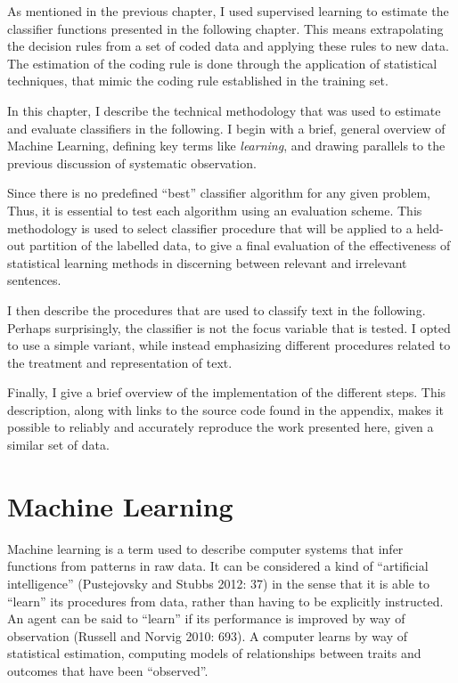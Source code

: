 \documentclass[12pt,twoside]{reedthesis}
\begin{document}
As mentioned in the previous chapter, I used supervised learning to
estimate the classifier functions presented in the following chapter.
This means extrapolating the decision rules from a set of coded data and
applying these rules to new data. The estimation of the coding rule is
done through the application of statistical techniques, that mimic the
coding rule established in the training set.

In this chapter, I describe the technical methodology that was used to
estimate and evaluate classifiers in the following. I begin with a
brief, general overview of Machine Learning, defining key terms like
\emph{learning}, and drawing parallels to the previous discussion of
systematic observation.

Since there is no predefined ``best'' classifier algorithm for any given
problem, Thus, it is essential to test each algorithm using an
evaluation scheme. This methodology is used to select classifier
procedure that will be applied to a held-out partition of the labelled
data, to give a final evaluation of the effectiveness of statistical
learning methods in discerning between relevant and irrelevant
sentences.

I then describe the procedures that are used to classify text in the
following. Perhaps surprisingly, the classifier is not the focus
variable that is tested. I opted to use a simple variant, while instead
emphasizing different procedures related to the treatment and
representation of text.

Finally, I give a brief overview of the implementation of the different
steps. This description, along with links to the source code found in
the appendix, makes it possible to reliably and accurately reproduce the
work presented here, given a similar set of data.

\section{Machine Learning}\label{machine-learning}

Machine learning is a term used to describe computer systems that infer
functions from patterns in raw data. It can be considered a kind of
``artificial intelligence'' (Pustejovsky and Stubbs 2012: 37) in the
sense that it is able to ``learn'' its procedures from data, rather than
having to be explicitly instructed. An agent can be said to ``learn'' if
its performance is improved by way of observation (Russell and Norvig
2010: 693). A computer learns by way of statistical estimation,
computing models of relationships between traits and outcomes that have
been ``observed''.
\end{document}
